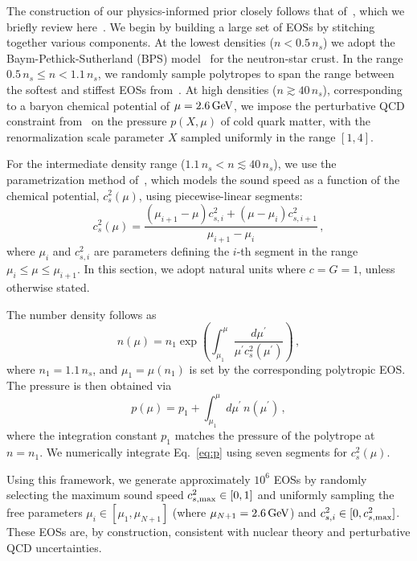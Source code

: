 \documentclass[twocolumn,linenumbers]{aastex631}
\begin{document}
The construction of our physics-informed prior closely follows that
of~\citet{Altiparmak:2022}, which we briefly review here~\citep[see][for
  additional details]{Ecker:2022, Ecker:2022dlg}. We begin by building a
large set of EOSs by stitching together various components. At the
lowest densities ($n<0.5\,n_s$) we adopt the Baym-Pethick-Sutherland
(BPS) model~\citep{Baym71} for the neutron-star crust. In the range
$0.5\,n_s\le n < 1.1\,n_s$, we randomly sample polytropes to span the
range between the softest and stiffest EOSs
from~\citet{Hebeler:2013nza}. At high densities ($n \gtrsim 40\,n_s$),
corresponding to a baryon chemical potential of $\mu = 2.6\,\rm GeV$, we
impose the perturbative QCD constraint from~\citet{Fraga2014} on the
pressure $p(X, \mu)$ of cold quark matter, with the renormalization scale
parameter $X$ sampled uniformly in the range $[1,4]$.
	
For the intermediate density range ($1.1\,n_s < n \lesssim 40\,n_s$), we
use the parametrization method of~\citet{Annala2019}, which models the
sound speed as a function of the chemical potential, $c_s^2(\mu)$, using
piecewise-linear segments:
%
\begin{equation} \label{eq:cs2}
 c_s^2(\mu) = \frac{\left(\mu_{i+1}-\mu \right) c_{s,i}^2 + \left(\mu -
   \mu_i \right) c_{s,i+1}^2}{\mu_{i+1}-\mu_i}\,,
\end{equation}
%
where $\mu_i$ and $c_{s,i}^2$ are parameters defining the $i$-th segment
in the range $\mu_i \leq \mu \leq \mu_{i+1}$. In this section, we
adopt natural units where $c=G=1$, unless otherwise stated.

The number density follows as 
%
\begin{equation} \label{eq:n}
 n(\mu) = n_1 \exp \left({\int_{\mu_1}^\mu \frac{d\mu^\prime}{\mu^\prime
     c_s^2(\mu^\prime)}}\right)\,,
\end{equation} 
%
where $n_1 = 1.1\,n_s$, and $\mu_1 = \mu(n_1)$ is set by the
corresponding polytropic EOS. The pressure is then obtained via
%
\begin{equation} \label{eq:p}
 p(\mu) = p_1 + \int_{\mu_1}^\mu d\mu^\prime \, n(\mu^\prime)\,,
\end{equation}
%
where the integration constant $p_1$ matches the pressure of the
polytrope at $n = n_1$. We numerically integrate Eq.~\eqref{eq:p} using
seven segments for $c_s^2(\mu)$.

Using this framework, we generate approximately $10^6$ EOSs by randomly
selecting the maximum sound speed $c_{s,{\rm max}}^2 \in [0,1]$ and
uniformly sampling the free parameters $\mu_i \in [\mu_1, \mu_{N+1}]$
(where $\mu_{N+1} = 2.6\,\rm GeV$) and $c_{s,i}^2 \in [0, c_{s,{\rm
      max}}^2]$. These EOSs are, by construction, consistent with
nuclear theory and perturbative QCD uncertainties.
\end{document}
